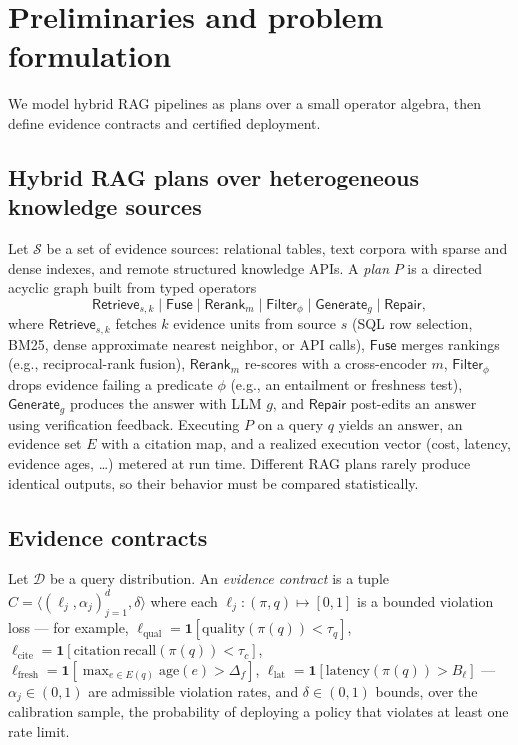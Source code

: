 \section{Preliminaries and problem formulation}
\label{sec:prelim}

We model hybrid RAG pipelines as plans over a small operator algebra,
then define evidence contracts and certified deployment.

\subsection{Hybrid RAG plans over heterogeneous knowledge sources}
\label{sec:algebra}

Let $\mathcal{S}$ be a set of evidence sources: relational tables, text
corpora with sparse and dense indexes, and remote structured knowledge
APIs. A \emph{plan} $P$ is a directed acyclic graph built from typed
operators
\[
\textsf{Retrieve}_{s,k} \mid \textsf{Fuse} \mid \textsf{Rerank}_m
\mid \textsf{Filter}_\phi \mid \textsf{Generate}_g \mid
\textsf{Repair},
\]
where $\textsf{Retrieve}_{s,k}$ fetches $k$ evidence units from source
$s$ (SQL row selection, BM25, dense approximate nearest neighbor, or
API calls), $\textsf{Fuse}$ merges rankings (e.g., reciprocal-rank
fusion), $\textsf{Rerank}_m$ re-scores with a cross-encoder $m$,
$\textsf{Filter}_\phi$ drops evidence failing a predicate $\phi$ (e.g.,
an entailment or freshness test), $\textsf{Generate}_g$ produces the
answer with LLM $g$, and $\textsf{Repair}$ post-edits an answer using
verification feedback. Executing $P$ on a query $q$ yields an answer,
an evidence set $E$ with a citation map, and a realized execution
vector (cost, latency, evidence ages, \dots) metered at run time.
Different RAG plans rarely produce identical outputs, so their behavior
must be compared statistically.

\subsection{Evidence contracts}

\begin{definition}
\label{def:contract}
Let $\mathcal{D}$ be a query distribution. An \emph{evidence contract}
is a tuple $C = \langle (\ell_j, \alpha_j)_{j=1}^{d}, \delta \rangle$
where each $\ell_j : (\pi, q) \mapsto [0,1]$ is a bounded violation
loss --- for example,
$\ell_{\mathrm{qual}} = \mathbf{1}[\mathrm{quality}(\pi(q)) < \tau_q]$,
$\ell_{\mathrm{cite}} =
\mathbf{1}[\mathrm{citation\ recall}(\pi(q)) < \tau_c]$,
$\ell_{\mathrm{fresh}} =
\mathbf{1}[\max_{e \in E(q)} \mathrm{age}(e) > \Delta_f]$,
$\ell_{\mathrm{lat}} = \mathbf{1}[\mathrm{latency}(\pi(q)) > B_\ell]$
--- $\alpha_j \in (0,1)$ are admissible violation rates, and
$\delta \in (0,1)$ bounds, over the calibration sample, the probability
of deploying a policy that violates at least one rate limit.
\end{definition}

